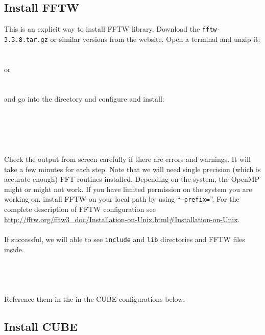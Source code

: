\documentclass[12pt]{article}
\begin{document}
\subsection{Install FFTW}
This is an explicit way to install FFTW library. Download the {\tt fftw-3.3.8.tar.gz} or similar versions from the website.
Open a terminal and unzip it:
\\\\
 \\
or\\
\\
\\
and go into the directory and configure and install:
\\\\
\\
\\
\\
\\
Check the output from screen carefully if there are errors and warnings. It will take a few minutes for each step. Note that we will need single precision (which is accurate enough) FFT routines installed. Depending on the system, the OpenMP might or might not work. If you have limited permission on the system you are working on, install FFTW on your local path by using ``{\tt --prefix=}''. For the complete description of FFTW configuration see \url{http://fftw.org/fftw3_doc/Installation-on-Unix.html#Installation-on-Unix}.
\\\\
If successful, we will able to see {\tt include} and {\tt lib} directories and FFTW files inside.
\\\\
 \\
 \\
\\
Reference them in the in the CUBE configurations below.



\subsection{Install CUBE}
\end{document}
